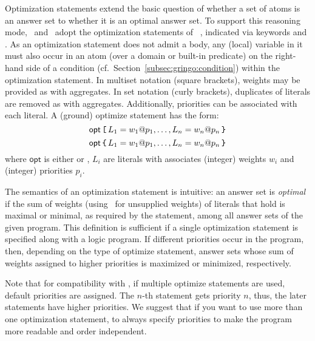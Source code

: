 Optimization statements extend the basic question of
whether a set of atoms is an answer set to
whether it is an optimal answer set.
To support this reasoning mode, \gringo\ and \clingo\ adopt the
optimization statements of \lparse~\cite{lparseManual},
indicated via keywords  and .
As an optimization statement does not admit a body, any (local) variable
in it must also occur in an atom (over a domain or built-in predicate)
on the right-hand side of a condition (cf.\ Section~\ref{subsec:gringo:condition})
within the optimization statement.
In multiset notation (square brackets),
weights may be provided as with  aggregates. %
In set notation (curly brackets),
duplicates of literals are removed
as with  aggregates.
Additionally, priorities can be associated with each literal.
A (ground) optimize statement has the form:
\[\mathsf{opt}\,\code{[}\,L_1=w_1@p_1,\dots,L_n=w_n@p_n\,\code{\char`\}}\]
\[\mathsf{opt}\,\code{\char`\{}\,L_1=w_1@p_1,\dots,L_n=w_n@p_n\,\code{\char`\}}\]
where $\mathsf{opt}$ is either  or  , $L_i$ are literals 
with associates (integer) weights $w_i$ and (integer) priorities $p_i$.

The semantics of an optimization statement is intuitive:
an answer set is \emph{optimal} if the sum of weights
(using~ for unsupplied weights)
of literals that hold is maximal or minimal, as required by the statement,
among all answer sets of the given program.
This definition is sufficient if a single optimization statement is specified
along with a logic program.
If different priorities occur in the program, 
then, depending on the type of optimize statement,
answer sets whose sum of weights assigned to higher priorities
is maximized or minimized, respectively.

Note that for compatibility with \lparse, if multiple optimize statements are used, 
default priorities are assigned.
The $n$-th statement gets priority $n$, thus, the later statements have higher priorities.
We suggest that if you want to use more than one optimization statement,
to always specify priorities to make the program more readable and order independent.

